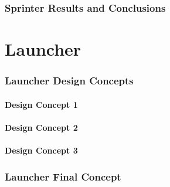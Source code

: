 \clearpage
\section{Sprinter Results and Conclusions}
\label{sec:Sprinter Results and Conclusions}


\clearpage
\part{Launcher}
\label{part:launcher}

\section{Launcher Design Concepts}
\label{sec:Launcher Design Concepts}
  \subsection{Design Concept 1}
  \label{sub:Design Concept 1}

  \subsection{Design Concept 2}
  \label{sub:Design Concept 2}

  \subsection{Design Concept 3}
  \label{sub:Design Concept 3}

\clearpage
\section{Launcher Final Concept}
\label{sec:Launcher Final Concept}

\clearpage
